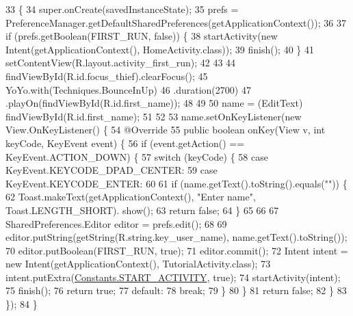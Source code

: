 \begin{DoxyCode}
33                                                        \{
34         super.onCreate(savedInstanceState);
35         prefs = PreferenceManager.getDefaultSharedPreferences(getApplicationContext());
36 
37         \textcolor{keywordflow}{if} (prefs.getBoolean(FIRST\_RUN, \textcolor{keyword}{false})) \{
38             startActivity(\textcolor{keyword}{new} Intent(getApplicationContext(), HomeActivity.class));
39             finish();
40         \}
41         setContentView(R.layout.activity\_first\_run);
42 
43 
44         findViewById(R.id.focus\_thief).clearFocus();
45         YoYo.with(Techniques.BounceInUp)
46                 .duration(2700)
47                 .playOn(findViewById(R.id.first\_name));
48 
49 
50         name = (EditText) findViewById(R.id.first\_name);
51 
52 
53         name.setOnKeyListener(\textcolor{keyword}{new} View.OnKeyListener() \{
54             @Override
55             \textcolor{keyword}{public} \textcolor{keywordtype}{boolean} onKey(View v, \textcolor{keywordtype}{int} keyCode, KeyEvent event) \{
56                 \textcolor{keywordflow}{if} (event.getAction() == KeyEvent.ACTION\_DOWN) \{
57                     \textcolor{keywordflow}{switch} (keyCode) \{
58                         \textcolor{keywordflow}{case} KeyEvent.KEYCODE\_DPAD\_CENTER:
59                         \textcolor{keywordflow}{case} KeyEvent.KEYCODE\_ENTER:
60 
61                             \textcolor{keywordflow}{if} (name.getText().toString().equals(\textcolor{stringliteral}{""})) \{
62                                 Toast.makeText(getApplicationContext(), \textcolor{stringliteral}{"Enter name"}, Toast.LENGTH\_SHORT).
      show();
63                                 \textcolor{keywordflow}{return} \textcolor{keyword}{false};
64                             \}
65 
66 
67                             SharedPreferences.Editor editor = prefs.edit();
68 
69                             editor.putString(getString(R.string.key\_user\_name), name.getText().toString());
70                             editor.putBoolean(FIRST\_RUN, \textcolor{keyword}{true});
71                             editor.commit();
72                             Intent intent = \textcolor{keyword}{new} Intent(getApplicationContext(), TutorialActivity.class);
73                             intent.putExtra(\hyperlink{classorg_1_1buildmlearn_1_1toolkit_1_1constant_1_1Constants_a2799e097282009a747db0225f72508ff}{Constants.START\_ACTIVITY}, \textcolor{keyword}{true});
74                             startActivity(intent);
75                             finish();
76                             \textcolor{keywordflow}{return} \textcolor{keyword}{true};
77                         \textcolor{keywordflow}{default}:
78                             \textcolor{keywordflow}{break};
79                     \}
80                 \}
81                 \textcolor{keywordflow}{return} \textcolor{keyword}{false};
82             \}
83         \});
84     \}
\end{DoxyCode}


